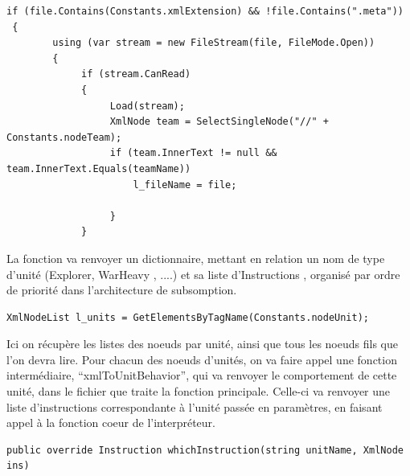 \documentclass{report}
\begin{document}
\begin{lstlisting}[frame=single]
 if (file.Contains(Constants.xmlExtension) && !file.Contains(".meta"))
 {
        using (var stream = new FileStream(file, FileMode.Open))
        {
             if (stream.CanRead)
             {
                  Load(stream);
                  XmlNode team = SelectSingleNode("//" + Constants.nodeTeam);
                  if (team.InnerText != null && team.InnerText.Equals(teamName))
                      l_fileName = file;

                  }
             }

\end{lstlisting}


La fonction va renvoyer un dictionnaire, mettant en relation un nom de type d'unité (Explorer, WarHeavy , ....) et sa liste d'Instructions , organisé par ordre de priorité dans l'architecture de subsomption.

\begin{lstlisting}[frame=single]
XmlNodeList l_units = GetElementsByTagName(Constants.nodeUnit);
\end{lstlisting}

Ici on récupère les listes des noeuds par unité, ainsi que tous les noeuds fils que l’on devra lire.
Pour chacun des noeuds d'unités, on va faire appel une fonction intermédiaire, “xmlToUnitBehavior”, qui va renvoyer le comportement de cette unité, dans le fichier que traite la fonction principale.
Celle-ci va renvoyer une liste d’instructions correspondante à l’unité passée en paramètres, en faisant appel à la fonction coeur de l’interpréteur.

\begin{lstlisting}[frame=single]
public override Instruction whichInstruction(string unitName, XmlNode ins)
\end{lstlisting}
\end{document}
